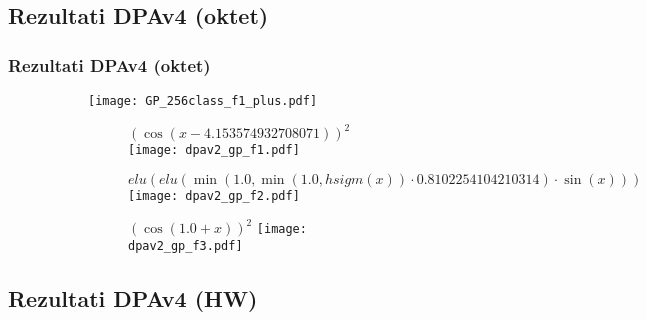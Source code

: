 \documentclass{beamer}
\begin{document}
\subsection{Rezultati DPAv4 (oktet)}

\begin{frame}
\frametitle{Rezultati DPAv4 (oktet)}

\begin{figure}
\centering
\begin{subfigure}{.49\textwidth}
  \centering
  \texttt{[image: GP\_256class\_f1\_plus.pdf]}
\end{subfigure}
\begin{subfigure}{.49\textwidth}
  \centering
  \begin{subfigure}{\linewidth}
    \centering
    \tiny $(\cos(x-4.153574932708071))^2$
    \texttt{[image: dpav2\_gp\_f1.pdf]}
  \end{subfigure}
  \begin{subfigure}{\linewidth}
    \centering
    \vspace{2mm}
    \tiny $elu (elu (\min (1.0,\min (1.0,hsigm (x)) \cdot 0.8102254104210314) \cdot \sin (x)))$
    \texttt{[image: dpav2\_gp\_f2.pdf]}
  \end{subfigure}
  \begin{subfigure}{\linewidth}
    \centering
    \vspace{2mm}
    \tiny $(\cos(1.0 + x))^2$
    \texttt{[image: dpav2\_gp\_f3.pdf]}
  \end{subfigure}
\end{subfigure}
\end{figure}

\end{frame}

\subsection{Rezultati DPAv4 (HW)}
\end{document}
